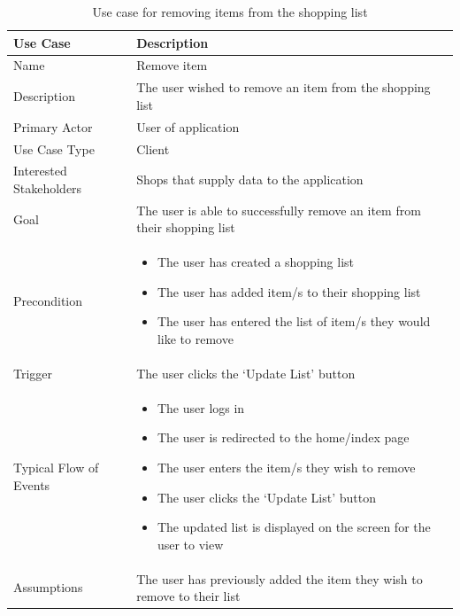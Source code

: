 \documentclass[10pt,twocolumn]{witseiepaper}
\begin{document}
		\begin{table}[h]
			\centering
			\caption{Use case for removing items from the shopping list}
			\label{uc:remove_item}
			\begin{tabular}{|p{}|p{}|}
				\hline
				\textbf{Use Case} & \textbf{Description} \\ \hline
				Name & Remove item \\ \hline
				Description & The user wished to remove an item from the shopping list \\ \hline
				Primary Actor & User of application \\ \hline
				Use Case Type & Client \\ \hline
				Interested Stakeholders & Shops that supply data to the application \\ \hline
				Goal & The user is able to successfully remove an item from their shopping list \\ \hline
				Precondition &
				\begin{itemize}
					\item The user has created a shopping list
					\item The user has added item/s to their shopping list
					\item The user has entered the list of item/s they would like to remove
				\end{itemize}
				\\ \hline
				Trigger & The user clicks the `Update List' button \\ \hline
				Typical Flow of Events & 
				\begin{itemize}
					\item The user logs in
					\item The user is redirected to the home/index page
					\item The user enters the item/s they wish to remove
					\item The user clicks the `Update List' button
					\item The updated list is displayed on the screen for the user to view
				\end{itemize}
				\\ \hline
				Assumptions & The user has previously added the item they wish to remove to their list \\
				\hline
			\end{tabular}
		\end{table}
		
\end{document}
